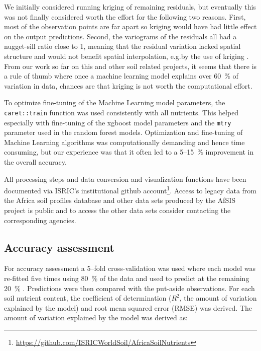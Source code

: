 \begin{linenumbers}
We initially considered running kriging of remaining residuals, but eventually this was not finally considered worth the effort for the following two reasons. First, most of the observation points are far apart so kriging would have had little effect on the output predictions. Second, the variograms of the residuals all had a nugget-sill ratio close to 1, meaning that the residual variation lacked spatial structure and would not benefit spatial interpolation, e.g.\@ by the use of kriging \citep{hengl2007regression}. From our work so far on this and other soil related projects, it seems that there is a rule of thumb where once a machine learning model explains over \SI{60}{\percent} of variation in data, chances are that kriging is not worth the computational effort. \par

To optimize fine-tuning of the Machine Learning model parameters, the \texttt{caret::train} function \citep{JSSv028i05} was used consistently with all nutrients. This helped especially with fine-tuning of the \textsf{xgboost} model parameters and the \verb"mtry" parameter used in the random forest models. Optimization and fine-tuning of Machine Learning algorithms was computationally demanding and hence time consuming, but our experience was that it often led to a 5--\SI{15}{\percent} improvement in the overall accuracy.\par

All processing steps and data conversion and visualization functions have been documented via ISRIC's institutional github account\footnote{\url{https://github.com/ISRICWorldSoil/AfricaSoilNutrients}}. Access to legacy data from the Africa soil profiles database and other data sets produced by the AfSIS project is public and to access the other data sets consider contacting the corresponding agencies.\par

\subsection{Accuracy assessment}

For accuracy assessment a 5--fold cross-validation was used where each model was re-fitted five times using \SI{80}{\percent} of the data and used to predict at the remaining \SI{20}{\percent} \citep{JSSv028i05}. Predictions were then compared with the put-aside observations. For each soil nutrient content, the coefficient of determination ($R^2$, the amount of variation explained by the model) and root mean squared error (RMSE) was derived. The amount of variation explained by the model was derived as:


\end{linenumbers}
